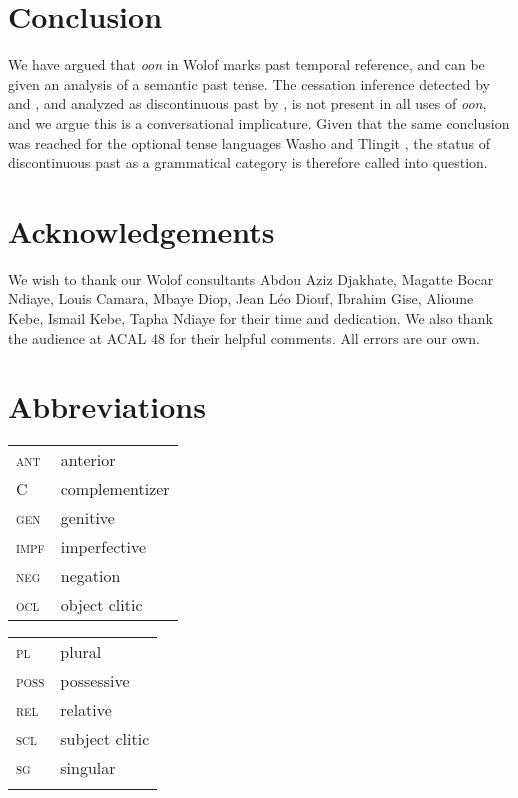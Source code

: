 \documentclass[output=paper,newtxmath,modfonts,nonflat,draftmode]{langsci/langscibook}
\begin{document}
\section{Conclusion}\label{sec:bochnak:6}

We have argued that \textit{oon} in Wolof marks past temporal reference, and can be given an analysis of a semantic past tense. The cessation inference detected by \citet{church81systeme} and
\citet{robert91approche}, and analyzed as discontinuous past by
\citet{Plungian2006}, is not present in all uses of \textit{oon},
and we argue this is a conversational implicature. Given that the same conclusion was reached for the optional tense languages Washo \citep{bochnak16past} and Tlingit \citep{Cable2017a}, the status of discontinuous past as a grammatical category is therefore called into question. 

\section*{Acknowledgements}

We wish to thank our Wolof consultants Abdou Aziz Djakhate, Magatte Bocar Ndiaye, Louis Camara, Mbaye
Diop, Jean L\'eo Diouf, Ibrahim Gise,  Alioune Kebe, Ismail Kebe,
Tapha Ndiaye for their time and dedication. We also thank the audience
at ACAL 48 for their helpful comments. All errors are our own.  


\section*{Abbreviations}

\begin{tabularx}{.5\textwidth}{@{}lQ@{}}
\textsc{ant}  &  anterior\\
 C &  complementizer\\
 \textsc{gen}  &  genitive\\
 \textsc{impf}  &  imperfective\\
 \textsc{neg}  & negation\\
 \textsc{ocl}  &  object clitic\\
\end{tabularx}%
\begin{tabularx}{.5\textwidth}{@{}lQ@{}}
 \textsc{pl}  &  plural\\
 \textsc{poss}  &  possessive\\
\textsc{rel}  &  relative\\
 \textsc{scl}  &  subject clitic\\
 \textsc{sg}  &  singular\\
 \\
\end{tabularx}



\sloppy
\printbibliography[heading=subbibliography,notkeyword=this]
\end{document}
